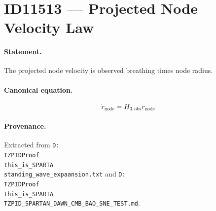 \section*{ID11513 --- Projected Node Velocity Law}

\paragraph{Statement.}
The projected node velocity is observed breathing times node radius.

\paragraph{Canonical equation.}
\[
\dot r_{\mathrm{node}}=H_{3,\mathrm{obs}}r_{\mathrm{node}}
\]

\paragraph{Provenance.}
Extracted from \texttt{D:\\TZPIDProof\\this\_is\_SPARTA\\standing\_wave\_expaansion.txt} and \texttt{D:\\TZPIDProof\\this\_is\_SPARTA\\TZPID\_SPARTAN\_DAWN\_CMB\_BAO\_SNE\_TEST.md}.
